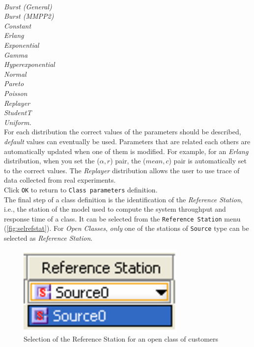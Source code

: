\\
\emph{Burst (General)\\
Burst (MMPP2)\\
Constant\\
Erlang\\
Exponential\\
Gamma\\
Hyperexponential\\
Normal\\
Pareto\\
Poisson\\
Replayer\\
StudentT\\
Uniform.\\
} For each distribution the correct values of the
parameters should be described, \emph{default} values can eventually be
used. Parameters that are related each others are automatically
updated when one of them is modified. For example, for an
\emph{Erlang} distribution, when you set the ($\alpha, r$) pair, the
($mean, c$) pair is automatically set to the correct values. The
\emph{Replayer} distribution
allows the user to use trace of data collected from real experiments.\\
Click \texttt{OK} to return to \texttt{Class parameters} definition.\\
The final step of a class definition is the identification of the
\emph{Reference Station}, i.e., the station of the model used to
compute the system throughput and response time of a class. It can be
selected from
the \texttt{Reference
Station} menu (\autoref{fig:selrefstat}). For
\emph{Open Classes}, \emph{only} one of the stations of
\texttt{Source} type can be selected as \emph{Reference Station}.
\begin{figure}[htb!]
    \begin{center}
        \includegraphics[scale=.5]{img/jsimg/3.6.eps}
    \end{center}
    \caption{Selection of the Reference Station for an open class of customers}
    \label{fig:selrefstat}
\end{figure}\\

